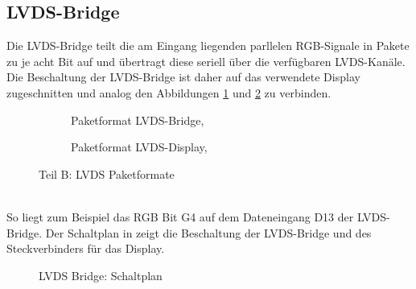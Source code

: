 \subsection{LVDS-Bridge}
Die LVDS-Bridge teilt die am Eingang liegenden parllelen RGB-Signale in Pakete zu je acht Bit auf und übertragt diese seriell über die verfügbaren LVDS-Kanäle. Die Beschaltung der LVDS-Bridge ist daher auf das verwendete Display  zugeschnitten und analog den Abbildungen \ref{fig:teilb_lvds_bridge_format} und \ref{fig:teilb_lvds_display_format} zu verbinden.
\begin{figure}[htbp]
        \begin{center}
        \begin{subfigure}[htp]{0.48\textwidth}
 			\caption{Paketformat LVDS-Bridge, \cite{TI2011b}}
            \label{fig:teilb_lvds_bridge_format}
        \end{subfigure}
        \quad
        \begin{subfigure}[htp]{0.48\textwidth}
            \caption{Paketformat LVDS-Display, \cite{LG2012}}
            \label{fig:teilb_lvds_display_format}
        \end{subfigure}
		\end{center}
        \caption{Teil B: LVDS Paketformate}
        \label{fig:teilb_lvds_format}
\end{figure} \\
So liegt zum Beispiel das RGB Bit G4 auf dem Dateneingang D13 der LVDS-Bridge. Der Schaltplan in  zeigt die Beschaltung der LVDS-Bridge und des Steckverbinders für das Display.\\
\begin{figure}[htp]
		\center
        \caption{LVDS Bridge: Schaltplan}
       \label{fig:teilb_lvds_bridge_sch}
\end{figure}\\
